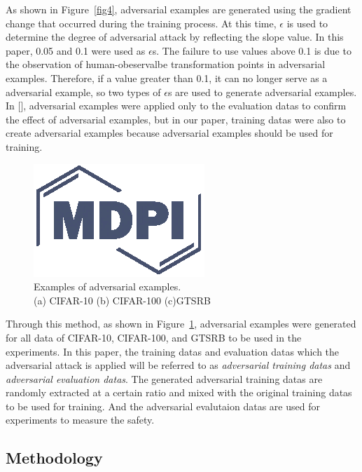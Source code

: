 \documentclass[journal,article,submit,moreauthors,pdftex]{Definitions/mdpi}
\begin{document}
As shown in Figure~\ref{fig4}, adversarial examples are generated using the gradient change that occurred during the training process.
At this time, \begin{math}\epsilon\end{math} is used to determine the degree of adversarial attack by reflecting the slope value.
In this paper, 0.05 and 0.1 were used as \begin{math}\epsilon\end{math}s. The failure to use values above 0.1 is due to the observation of human-obeservalbe transformation points in adversarial examples.
Therefore, if a value greater than 0.1, it can no longer serve as a adversarial example, so two types of \begin{math}\epsilon\end{math}s are used to generate adversarial examples.
In [], adversarial examples were applied only to the evaluation datas to confirm the effect of adversarial examples, but in our paper, training datas were also to create adversarial examples because adversarial examples should be used for training.

\begin{figure}[H]
\includegraphics[width=5 cm]{Definitions/logo-mdpi}
\caption{Examples of adversarial examples.\\(a) CIFAR-10 (b) CIFAR-100 (c)GTSRB\label{fig5}}
\end{figure} 

Through this method, as shown in Figure~\ref{fig5}, adversarial examples were generated for all data of CIFAR-10, CIFAR-100, and GTSRB to be used in the experiments.
In this paper, the training datas and evaluation datas which the adversarial attack is applied will be referred to as {\it adversarial training datas} and {\it adversarial evaluation datas}.
The generated adversarial training datas are randomly extracted at a certain ratio and mixed with the original training datas to be used for training. And the adversarial evalutaion datas are used for experiments to measure the safety.

\subsection{Methodology}
\end{document}
